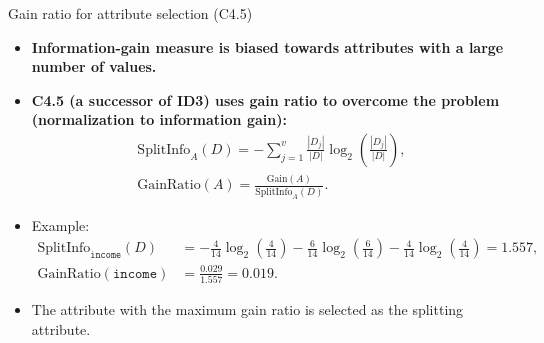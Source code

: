 \documentclass[aspectratio=169,t,table]{beamer}
\begin{document}
  {
    \begin{frame}{Gain ratio for attribute selection (C4.5)}
      \begin{itemize}
        \item \textbf{Information-gain measure is biased towards attributes with a large number of values.}
        \item \textbf{C4.5 (a successor of ID3) uses gain ratio to overcome the problem (normalization to information gain):}
        \begin{align}
          \text{SplitInfo}_A(D) = - \sum_{j=1}^{v} \frac{|D_j|}{|D|} \log_2\left( \frac{|D_j|}{|D|} \right),\\
          \text{GainRatio}(A) = \frac{\text{Gain}(A)}{\text{SplitInfo}_A(D)}.
        \end{align}
        \item Example:
        \begin{align}
          \text{SplitInfo}_{\texttt{income}}(D) &= -\frac{4}{14} \log_2 \left( \frac{4}{14} \right) - \frac{6}{14} \log_2 \left( \frac{6}{14} \right) - \frac{4}{14} \log_2 \left( \frac{4}{14} \right) = 1.557,\\
          \text{GainRatio}(\texttt{income}) &= \frac{0.029}{1.557} = 0.019.
        \end{align}
        \item The attribute with the maximum gain ratio is selected as the splitting attribute.
      \end{itemize}
    \end{frame}
  }
\end{document}
